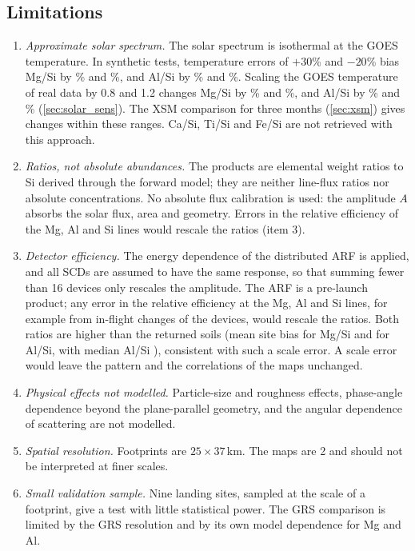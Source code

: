 \subsection{Limitations}\label{sec:limitations}
\begin{enumerate}
\item \emph{Approximate solar spectrum.} The solar spectrum is isothermal at the GOES temperature. In synthetic tests, temperature errors of $+30$\% and $-20$\% bias Mg/Si by \SynHotMg\% and \SynColdMg\%, and Al/Si by \SynHotAl\% and \SynColdAl\%. Scaling the GOES temperature of real data by 0.8 and 1.2 changes Mg/Si by \TsensMgLo\% and \TsensMgHi\%, and Al/Si by \TsensAlLo\% and \TsensAlHi\% (\cref{sec:solar_sens}). The XSM comparison for three months (\cref{sec:xsm}) gives changes within these ranges. Ca/Si, Ti/Si and Fe/Si are not retrieved with this approach.
\item \emph{Ratios, not absolute abundances.} The products are elemental weight ratios to Si derived through the forward model; they are neither line-flux ratios nor absolute concentrations. No absolute flux calibration is used: the amplitude $A$ absorbs the solar flux, area and geometry. Errors in the relative efficiency of the Mg, Al and Si lines would rescale the ratios (item 3).
\item \emph{Detector efficiency.} The energy dependence of the distributed ARF is applied, and all SCDs are assumed to have the same response, so that summing fewer than 16 devices only rescales the amplitude. The ARF is a pre-launch product; any error in the relative efficiency at the Mg, Al and Si lines, for example from in-flight changes of the devices, would rescale the ratios. Both ratios are higher than the returned soils (mean site bias \SiteMgTwoBias{} for Mg/Si and \SiteAlTwoBias{} for Al/Si, with median Al/Si \MedAl), consistent with such a scale error. A scale error would leave the pattern and the correlations of the maps unchanged.
\item \emph{Physical effects not modelled.} Particle-size and roughness effects, phase-angle dependence beyond the plane-parallel geometry, and the angular dependence of scattering are not modelled.
\item \emph{Spatial resolution.} Footprints are $25\times37$\,km. The maps are 2\textdegree{} and should not be interpreted at finer scales.
\item \emph{Small validation sample.} Nine landing sites, sampled at the scale of a footprint, give a test with little statistical power. The GRS comparison is limited by the GRS resolution and by its own model dependence for Mg and Al.
\end{enumerate}
